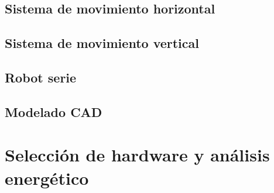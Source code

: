 \documentclass[a4paper,12pt]{report}
\begin{document}
%
%
%

%
\subsection{Sistema de movimiento horizontal}


%

\subsection{Sistema de movimiento vertical}


%

\subsection{Robot serie}

%




\subsection{Modelado CAD}
%

%

\section{Selección de hardware y análisis energético}

\end{document}
